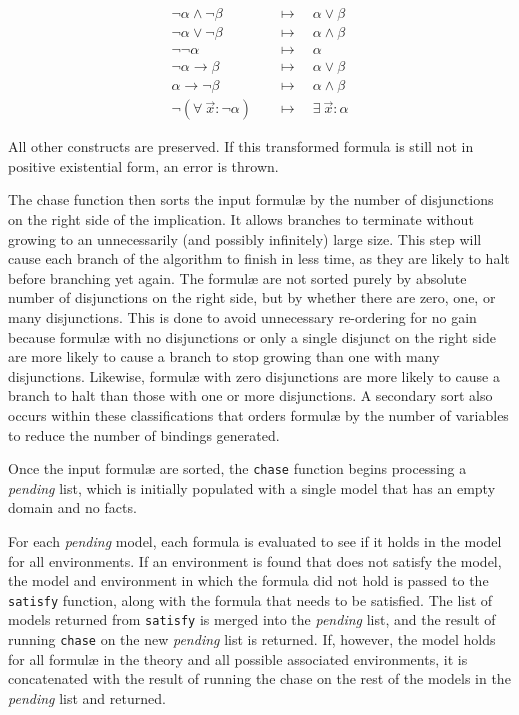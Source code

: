 		\begin{align*}
		\neg\alpha \wedge \neg\beta         \quad & \mapsto \quad \alpha \vee \beta        \\
		\neg\alpha \vee \neg\beta           \quad & \mapsto \quad \alpha \wedge \beta      \\
		\neg\neg\alpha                      \quad & \mapsto \quad \alpha                   \\
		\neg\alpha \to \beta                \quad & \mapsto \quad \alpha \vee \beta        \\
		\alpha \to \neg\beta                \quad & \mapsto \quad \alpha \wedge \beta      \\
		\neg(\forall\ \vec{x} : \neg\alpha) \quad & \mapsto \quad \exists\ \vec{x} : \alpha
		\end{align*}

		All other constructs are preserved. If this transformed formula is still
		not in positive existential form, an error is thrown.

		The chase function then sorts the input formul{\ae} by the number of
		disjunctions on the right side of the implication. It allows branches to
		terminate without growing to an unnecessarily (and possibly infinitely)
		large size. This step will cause each branch of the algorithm to finish in
		less time, as they are likely to halt before branching yet again. The
		formul{\ae} are not sorted purely by absolute number of disjunctions on the
		right side, but by whether there are zero, one, or many disjunctions. This
		is done to avoid unnecessary re-ordering for no gain because formul{\ae}
		with no disjunctions or only a single disjunct on the right side are more
		likely to cause a branch to stop growing than one with many disjunctions.
		Likewise, formul{\ae} with zero disjunctions are more likely to cause a
		branch to halt than those with one or more disjunctions. A secondary sort
		also occurs within these classifications that orders formul{\ae} by the
		number of variables to reduce the number of bindings generated.

		Once the input formul{\ae} are sorted, the {\tt chase} function begins
		processing a \emph{pending} list, which is initially populated with a
		single model that has an empty domain and no facts.

		For each \emph{pending} model, each formula is evaluated to see if it
		holds in the model for all environments. If an environment is found
		that does not satisfy the model, the model and environment in which the
		formula did not hold is passed to the {\tt satisfy} function, along
		with the formula that needs to be satisfied. The list of models
		returned from {\tt satisfy} is merged into the \emph{pending} list, and
		the result of running {\tt chase} on the new \emph{pending} list is
		returned. If, however, the model holds for all formul{\ae} in the
		theory and all possible associated environments, it is concatenated
		with the result of running the chase on the rest of the models in the
		\emph{pending} list and returned.

